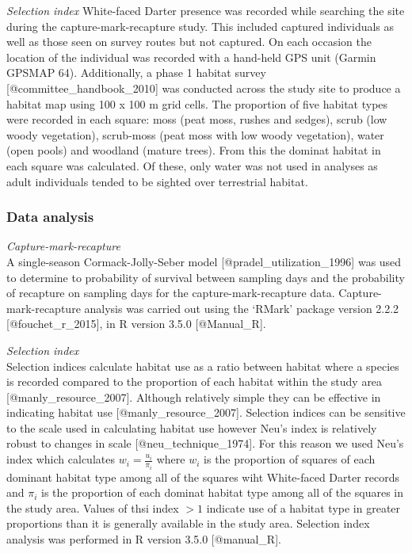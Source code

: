 \documentclass[]{article}
\begin{document}
\emph{Selection index} White-faced Darter presence was recorded while
searching the site during the capture-mark-recapture study. This
included captured individuals as well as those seen on survey routes but
not captured. On each occasion the location of the individual was
recorded with a hand-held GPS unit (Garmin GPSMAP 64). Additionally, a
phase 1 habitat survey {[}@committee\_handbook\_2010{]} was conducted
across the study site to produce a habitat map using 100 x 100 m grid
cells. The proportion of five habitat types were recorded in each
square: moss (peat moss, rushes and sedges), scrub (low woody
vegetation), scrub-moss (peat moss with low woody vegetation), water
(open pools) and woodland (mature trees). From this the dominat habitat
in each square was calculated. Of these, only water was not used in
analyses as adult individuals tended to be sighted over terrestrial
habitat.

\subsubsection{Data analysis}\label{data-analysis}

\emph{Capture-mark-recapture}\\
A single-season Cormack-Jolly-Seber model
{[}@pradel\_utilization\_1996{]} was used to determine to probability of
survival between sampling days and the probability of recapture on
sampling days for the capture-mark-recapture data.
Capture-mark-recapture analysis was carried out using the `RMark'
package version 2.2.2 {[}@fouchet\_r\_2015{]}, in R version 3.5.0
{[}@Manual\_R{]}.

\emph{Selection index}\\
Selection indices calculate habitat use as a ratio between habitat where
a species is recorded compared to the proportion of each habitat within
the study area {[}@manly\_resource\_2007{]}. Although relatively simple
they can be effective in indicating habitat use
{[}@manly\_resource\_2007{]}. Selection indices can be sensitive to the
scale used in calculating habitat use however Neu's index is relatively
robust to changes in scale {[}@neu\_technique\_1974{]}. For this reason
we used Neu's index which calculates \(w_{i} = \frac{u_{i}}{\pi_{i}}\)
where \(w_{i}\) is the proportion of squares of each dominant habitat
type among all of the squares wiht White-faced Darter records and
\(\pi_{i}\) is the proportion of each dominat habitat type among all of
the squares in the study area. Values of thsi index \(> 1\) indicate use
of a habitat type in greater proportions than it is generally available
in the study area. Selection index analysis was performed in R version
3.5.0 {[}@manual\_R{]}.
\end{document}
